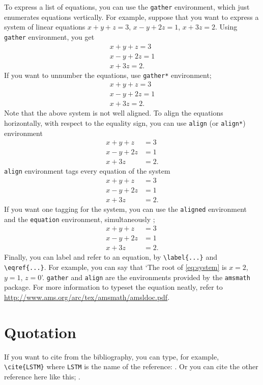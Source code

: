 \documentclass[11pt]{report}
\begin{document}
To express a list of equations, you can use the \texttt{gather} environment, which just enumerates equations vertically.
For example, suppose that you want to express a system of linear equations \(x+y+z=3\), \(x-y+2z=1\), \(x+3z=2\).
Using \texttt{gather} environment, you get
\begin{gather}
x+y+z=3\\
x-y+2z=1\\
x+3z=2.
\end{gather}
If you want to unnumber the equations, use \texttt{gather*} environment;
\begin{gather*}
x+y+z=3\\
x-y+2z=1\\
x+3z=2.
\end{gather*}
Note that the above system is not well aligned.
To align the equations horizontally, with respect to the equality sign, you can use \texttt{align} (or \texttt{align*}) environment
\begin{align*}
x+y+z&=3\\
x-y+2z&=1\\
x+3z&=2.
\end{align*}
\texttt{align} environment tags every equation of the system
\begin{align}
x+y+z&=3\\
x-y+2z&=1\\
x+3z&=2.
\end{align}
If you want one tagging for the system, you can use the \texttt{aligned} environment and the \texttt{equation} environment, simultaneously ;
\begin{equation}\label{eq:system}
\begin{aligned}
x+y+z&=3\\
x-y+2z&=1\\
x+3z&=2.
\end{aligned}
\end{equation}
Finally, you can label and refer to an equation, by \verb|\label{...}| and \verb|\eqref{...}|.
For example, you can say that `The root of \eqref{eq:system} is \(x=2\), \(y=1\), \(z=0\)'.
\texttt{gather} and \texttt{align} are the environments provided by the \texttt{amsmath} package.
For more information to typeset the equation neatly, refer to \url{http://www.ams.org/arc/tex/amsmath/amsldoc.pdf}.

\section{Quotation}
If you want to cite from the bibliography, you can type, for example, \verb|\cite{LSTM}| where \texttt{LSTM} is the name of the reference: \cite{LSTM}.
Or you can cite the other reference here like this; \cite{pure}.
\end{document}
